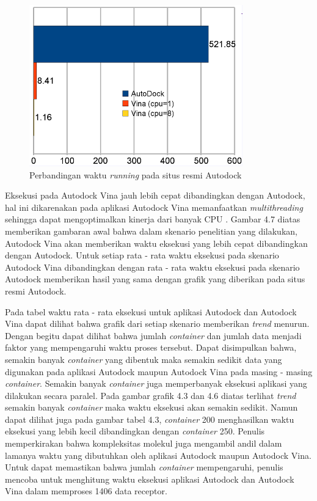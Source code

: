 \begin{figure}
	\centering
	\includegraphics{comparison_dockvina.PNG}
	\caption{Perbandingan waktu \textit{running} pada situs resmi Autodock \cite{autodockvina}}
\end{figure}

Eksekusi pada Autodock Vina jauh lebih cepat dibandingkan dengan Autodock, hal ini dikarenakan pada aplikasi Autodock Vina memanfaatkan \textit{multithreading} sehingga dapat mengoptimalkan kinerja dari banyak CPU \cite{autodockvina}. Gambar 4.7 diatas memberikan gambaran awal bahwa dalam skenario penelitian yang dilakukan, Autodock Vina akan memberikan waktu eksekusi yang lebih cepat dibandingkan dengan Autodock. Untuk setiap rata - rata waktu eksekusi pada skenario Autodock Vina dibandingkan dengan rata - rata waktu eksekusi pada skenario Autodock memberikan hasil yang sama dengan grafik yang diberikan pada situs resmi Autodock.

Pada tabel waktu rata - rata eksekusi untuk aplikasi Autodock dan Autodock Vina dapat dilihat bahwa grafik dari setiap skenario memberikan \textit{trend} menurun. Dengan begitu dapat dilihat bahwa jumlah \textit{container} dan jumlah data menjadi faktor yang mempengaruhi waktu proses tersebut. Dapat disimpulkan bahwa, semakin banyak \textit{container} yang dibentuk maka semakin sedikit data yang digunakan pada aplikasi Autodock maupun Autodock Vina pada masing - masing \textit{container}. Semakin banyak \textit{container} juga memperbanyak eksekusi aplikasi yang dilakukan secara paralel. Pada gambar  grafik 4.3 dan 4.6 diatas terlihat \textit{trend} semakin banyak \textit{container} maka waktu eksekusi akan semakin sedikit. Namun dapat dilihat juga pada gambar tabel 4.3, \textit{container} 200 menghasilkan waktu eksekusi yang lebih kecil dibandingkan dengan \textit{container} 250. Penulis memperkirakan bahwa kompleksitas molekul juga mengambil andil dalam lamanya waktu yang dibutuhkan oleh aplikasi Autodock maupun Autodock Vina. Untuk dapat memastikan bahwa jumlah \textit{container} mempengaruhi, penulis mencoba untuk menghitung waktu eksekusi aplikasi Autodock dan Autodock Vina dalam memproses 1406 data receptor.

